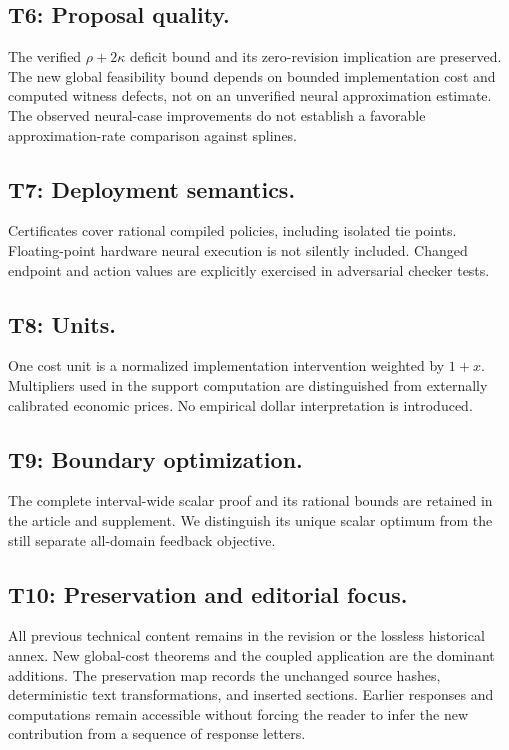 \subsection{T6: Proposal quality.}
The verified $\rho+2\kappa$ deficit bound and its zero-revision implication are preserved. The new global feasibility bound depends on bounded implementation cost and computed witness defects, not on an unverified neural approximation estimate. The observed neural-case improvements do not establish a favorable approximation-rate comparison against splines.

\subsection{T7: Deployment semantics.}
Certificates cover rational compiled policies, including isolated tie points. Floating-point hardware neural execution is not silently included. Changed endpoint and action values are explicitly exercised in adversarial checker tests.

\subsection{T8: Units.}
One cost unit is a normalized implementation intervention weighted by $1+x$. Multipliers used in the support computation are distinguished from externally calibrated economic prices. No empirical dollar interpretation is introduced.

\subsection{T9: Boundary optimization.}
The complete interval-wide scalar proof and its rational bounds are retained in the article and supplement. We distinguish its unique scalar optimum from the still separate all-domain feedback objective.

\subsection{T10: Preservation and editorial focus.}
All previous technical content remains in the revision or the lossless historical annex. New global-cost theorems and the coupled application are the dominant additions. The preservation map records the unchanged source hashes, deterministic text transformations, and inserted sections. Earlier responses and computations remain accessible without forcing the reader to infer the new contribution from a sequence of response letters.

